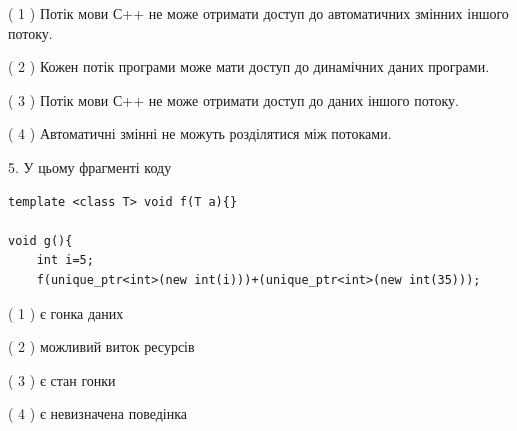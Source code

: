 \documentclass[12pt, ukrainian]{article}
\begin{document}
\begin {large}
{( 1 ) Потік мови С++ не може отримати доступ до автоматичних змінних іншого потоку.%

( 2 ) Кожен потік програми може мати доступ до динамічних даних програми.%

( 3 ) Потік мови С++ не може отримати доступ до даних іншого потоку.%

( 4 ) Автоматичні змінні не можуть розділятися між потоками.%


5. У цьому фрагменті коду
\begin{verbatim}
template <class T> void f(T a){}

void g(){
    int i=5;
    f(unique_ptr<int>(new int(i)))+(unique_ptr<int>(new int(35)));
\end{verbatim}
( 1 ) є гонка даних%

( 2 ) можливий виток ресурсів%

( 3 ) є стан гонки%

( 4 ) є невизначена поведінка%
}
\end {large}
\end{document}
